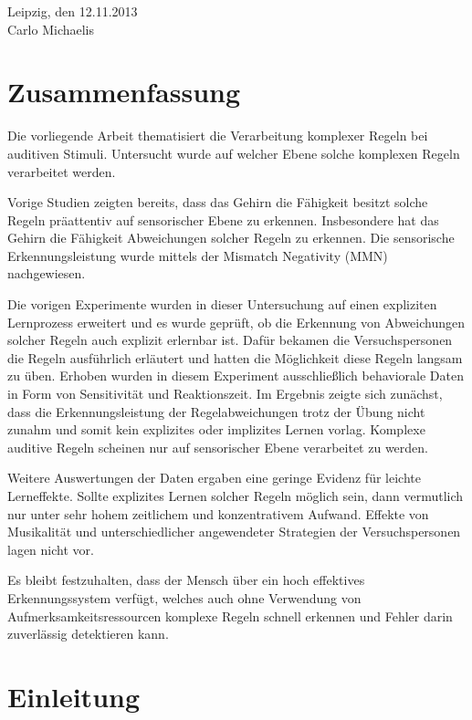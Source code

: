 \documentclass[doc,a4paper,12pt]{apa6}
\begin{document}
\vspace{3em}
\noindent Leipzig, den 12.11.2013\\ Carlo Michaelis

\newpage

\section*{Zusammenfassung}

Die vorliegende Arbeit thematisiert die Verarbeitung komplexer Regeln bei auditiven Stimuli. Untersucht wurde auf welcher Ebene solche komplexen Regeln verarbeitet werden.

Vorige Studien zeigten bereits, dass das Gehirn die Fähigkeit besitzt solche Regeln präattentiv auf sensorischer Ebene zu erkennen. Insbesondere hat das Gehirn die Fähigkeit Abweichungen solcher Regeln zu erkennen. Die sensorische Erkennungsleistung wurde mittels der Mismatch Negativity (MMN) nachgewiesen.

Die vorigen Experimente wurden in dieser Untersuchung auf einen expliziten Lernprozess erweitert und es wurde geprüft, ob die Erkennung von Abweichungen solcher Regeln auch explizit erlernbar ist. Dafür bekamen die Versuchspersonen die Regeln ausführlich erläutert und hatten die Möglichkeit diese Regeln langsam zu üben. Erhoben wurden in diesem Experiment ausschließlich behaviorale Daten in Form von Sensitivität und Reaktionszeit. Im Ergebnis zeigte sich zunächst, dass die Erkennungsleistung der Regelabweichungen trotz der Übung nicht zunahm und somit kein explizites oder implizites Lernen vorlag. Komplexe auditive Regeln scheinen nur auf sensorischer Ebene verarbeitet zu werden.

Weitere Auswertungen der Daten ergaben eine geringe Evidenz für leichte Lerneffekte. Sollte explizites Lernen solcher Regeln möglich sein, dann vermutlich nur unter sehr hohem zeitlichem und konzentrativem Aufwand. Effekte von Musikalität und unterschiedlicher angewendeter Strategien der Versuchspersonen lagen nicht vor.

Es bleibt festzuhalten, dass der Mensch über ein hoch effektives Erkennungssystem verfügt, welches auch ohne Verwendung von Aufmerksamkeitsressourcen komplexe Regeln schnell erkennen und Fehler darin zuverlässig detektieren kann.

\newpage

\setcounter{tocdepth}{2}
\tableofcontents
\newpage

\listoffigures
\newpage

\section{Einleitung}
\end{document}
